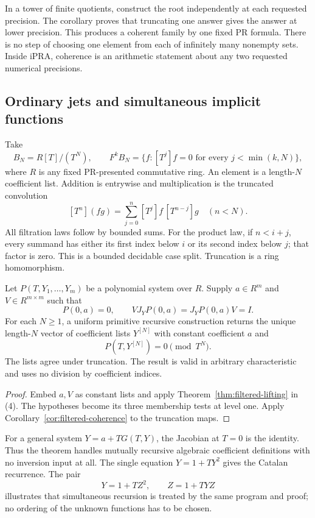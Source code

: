 In a tower of finite quotients, construct the root independently at each
requested precision.  The corollary proves that truncating one answer gives
the answer at lower precision.  This produces a coherent family by one
fixed PR formula.  There is no step of choosing one element from each of
infinitely many nonempty sets.  Inside iPRA, coherence is an arithmetic
statement about any two requested numerical precisions.

\subsection{Ordinary jets and simultaneous implicit functions}

Take
\[
 B_N=R[T]/(T^N),\qquad
 F^kB_N=\{f:[T^j]f=0\text{ for every }j<\min(k,N)\},
                                                               \tag{4}
\]
where $R$ is any fixed PR-presented commutative ring.  An element is a
length-$N$ coefficient list.  Addition is entrywise and multiplication is
the truncated convolution
\[
 [T^n](fg)=\sum_{j=0}^n [T^j]f\,[T^{n-j}]g\quad(n<N).
\]
All filtration laws follow by bounded sums.  For the product law, if
$n<i+j$, every summand has either its first index below $i$ or its second
index below $j$; that factor is zero.  This is a bounded decidable case
split.  Truncation is a ring homomorphism.

\begin{corollary}
\label{cor:formal-implicit}
Let $P(T,Y_1,\ldots,Y_m)$ be a polynomial system over $R$.  Supply
$a\in R^m$ and $V\in R^{m\times m}$ such that
\[
 P(0,a)=0,\qquad VJ_Y P(0,a)=J_Y P(0,a)V=I.
\]
For each $N\ge1$, a uniform primitive recursive construction returns the
unique length-$N$ vector of coefficient lists $Y^{[N]}$ with constant
coefficient $a$ and
\[
 P(T,Y^{[N]})=0\pmod {T^N}.
\]
The lists agree under truncation.  The result is valid in arbitrary
characteristic and uses no division by coefficient indices.
\end{corollary}

\begin{proof}
Embed $a,V$ as constant lists and apply Theorem~\ref{thm:filtered-lifting}
in (4).  The hypotheses become its three membership tests at level one.
Apply Corollary~\ref{cor:filtered-coherence} to the truncation maps.
\end{proof}

For a general system $Y=a+T G(T,Y)$, the Jacobian at $T=0$ is the identity.
Thus the theorem handles mutually recursive algebraic coefficient
definitions with no inversion input at all.  The single equation
$Y=1+TY^2$ gives the Catalan recurrence.  The pair
\[
 Y=1+TZ^2,\qquad Z=1+TYZ
\]
illustrates that simultaneous recursion is treated by the same program
and proof; no ordering of the unknown functions has to be chosen.


